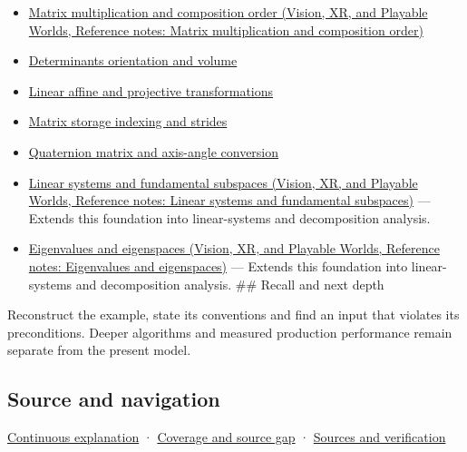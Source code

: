 \begin{itemize}
\tightlist
\item
  \href{../07-Vision-XR-and-Playable-Worlds/main.pdf\#nameddest=appendix-ab31ef447dbf}{Matrix multiplication and composition order (Vision, XR, and Playable Worlds, Reference notes: Matrix multiplication and composition order)}
\item
  \hyperref[appendix-da478be01d02]{Determinants orientation and volume}
\item
  \hyperref[appendix-0bf0ca73f735]{Linear affine and projective transformations}
\item
  \hyperref[appendix-ffdc1d4e5350]{Matrix storage indexing and strides}
\item
  \hyperref[appendix-26d8da71f6c4]{Quaternion matrix and axis-angle conversion}
\item
  \href{../07-Vision-XR-and-Playable-Worlds/main.pdf\#nameddest=appendix-8572a4a060c1}{Linear systems and fundamental subspaces (Vision, XR, and Playable Worlds, Reference notes: Linear systems and fundamental subspaces)} --- Extends this foundation into linear-systems and decomposition analysis.
\item
  \href{../07-Vision-XR-and-Playable-Worlds/main.pdf\#nameddest=appendix-0b3be18411f9}{Eigenvalues and eigenspaces (Vision, XR, and Playable Worlds, Reference notes: Eigenvalues and eigenspaces)} --- Extends this foundation into linear-systems and decomposition analysis. \#\# Recall and next depth
\end{itemize}

Reconstruct the example, state its conventions and find an input that violates its preconditions. Deeper algorithms and measured production performance remain separate from the present model.

\subsection{Source and navigation}\label{appendix-bd39c3bf5d64-source-and-navigation}

\hyperref[01-foundations-i-ch018-keep-the-promises-visible-while-moving-between-representations]{Continuous explanation} · \hyperref[appendix-fd090d982a15-phase-7---parts-601-700]{Coverage and source gap} · \hyperref[appendix-a103e7846d21-phase-7---source-analysis-and-verification]{Sources and verification}

